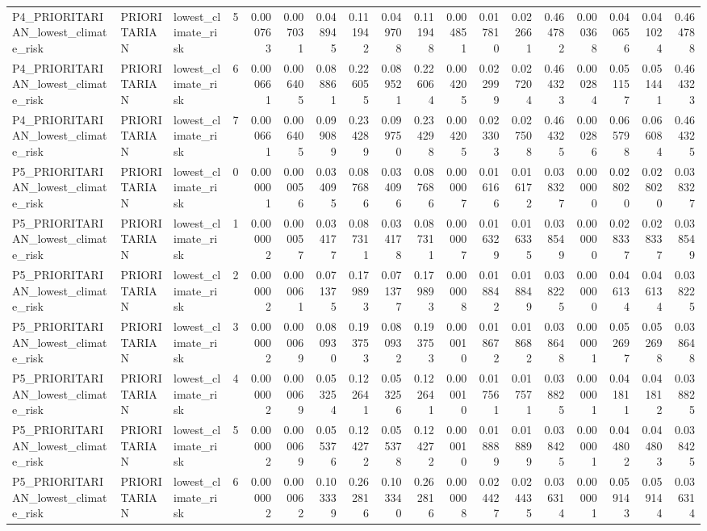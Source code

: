\begin{tabular}{lllrrrrrrrrrrrrrrr}
P4_PRIORITARIAN_lowest_climate_risk & PRIORITARIAN & lowest_climate_risk & 5 & 0.000763 & 0.007031 & 0.048945 & 0.111942 & 0.049708 & 0.111948 & 0.004851 & 0.017810 & 0.022661 & 0.464782 & 0.000368 & 0.040656 & 0.041024 & 0.464788 \\
P4_PRIORITARIAN_lowest_climate_risk & PRIORITARIAN & lowest_climate_risk & 6 & 0.000661 & 0.006405 & 0.088861 & 0.226055 & 0.089521 & 0.226064 & 0.004205 & 0.022999 & 0.027204 & 0.464323 & 0.000284 & 0.051157 & 0.051441 & 0.464323 \\
P4_PRIORITARIAN_lowest_climate_risk & PRIORITARIAN & lowest_climate_risk & 7 & 0.000661 & 0.006405 & 0.099089 & 0.234289 & 0.099750 & 0.234298 & 0.004205 & 0.023303 & 0.027508 & 0.464325 & 0.000286 & 0.065798 & 0.066084 & 0.464325 \\
P5_PRIORITARIAN_lowest_climate_risk & PRIORITARIAN & lowest_climate_risk & 0 & 0.000001 & 0.000056 & 0.034095 & 0.087686 & 0.034096 & 0.087686 & 0.000007 & 0.016166 & 0.016172 & 0.038327 & 0.000000 & 0.028020 & 0.028020 & 0.038327 \\
P5_PRIORITARIAN_lowest_climate_risk & PRIORITARIAN & lowest_climate_risk & 1 & 0.000002 & 0.000057 & 0.034177 & 0.087311 & 0.034178 & 0.087311 & 0.000007 & 0.016329 & 0.016335 & 0.038549 & 0.000000 & 0.028337 & 0.028337 & 0.038549 \\
P5_PRIORITARIAN_lowest_climate_risk & PRIORITARIAN & lowest_climate_risk & 2 & 0.000002 & 0.000061 & 0.071375 & 0.179893 & 0.071377 & 0.179893 & 0.000008 & 0.018842 & 0.018849 & 0.038225 & 0.000000 & 0.046134 & 0.046134 & 0.038225 \\
P5_PRIORITARIAN_lowest_climate_risk & PRIORITARIAN & lowest_climate_risk & 3 & 0.000002 & 0.000069 & 0.080930 & 0.193753 & 0.080932 & 0.193753 & 0.000010 & 0.018672 & 0.018682 & 0.038648 & 0.000001 & 0.052697 & 0.052698 & 0.038648 \\
P5_PRIORITARIAN_lowest_climate_risk & PRIORITARIAN & lowest_climate_risk & 4 & 0.000002 & 0.000069 & 0.053254 & 0.122641 & 0.053256 & 0.122641 & 0.000010 & 0.017561 & 0.017571 & 0.038825 & 0.000001 & 0.041811 & 0.041812 & 0.038825 \\
P5_PRIORITARIAN_lowest_climate_risk & PRIORITARIAN & lowest_climate_risk & 5 & 0.000002 & 0.000069 & 0.055376 & 0.124272 & 0.055378 & 0.124272 & 0.000010 & 0.018889 & 0.018899 & 0.038425 & 0.000001 & 0.044802 & 0.044803 & 0.038425 \\
P5_PRIORITARIAN_lowest_climate_risk & PRIORITARIAN & lowest_climate_risk & 6 & 0.000002 & 0.000062 & 0.103339 & 0.262816 & 0.103340 & 0.262816 & 0.000008 & 0.024427 & 0.024435 & 0.036314 & 0.000001 & 0.059143 & 0.059144 & 0.036314 \\

\end{tabular}
